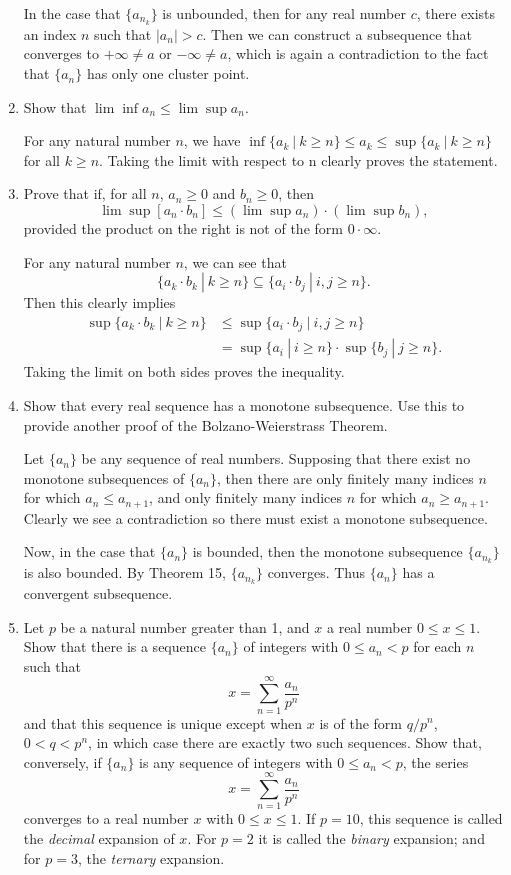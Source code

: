 \begin{enumerate}
	In the case that $\{a_{n_k}\}$ is unbounded, then for any real number $c$, there exists an index $n$ such that $|a_n| >c$.
	Then we can construct a subsequence that converges to $+\infty \neq a$ or $-\infty \neq a$, which is again a contradiction to the fact that $\{a_n\}$ has only one cluster point.
	\item Show that $\lim \inf a_n \le \lim \sup a_n$.\par
	For any natural number $n$, we have $\inf \{ a_k\ |\ k \ge n\} \le a_k \le \sup \{ a_k\ |\ k \ge n\}$ for all $k \ge n$.
	Taking the limit with respect to n clearly proves the statement.
	\item Prove that if, for all $n$, $a_n \ge 0$ and $b_n \ge 0 $, then \[ \lim \sup [a_n \cdot b_n] \le (\lim \sup a_n) \cdot (\lim \sup b_n),\] provided the product on the right is not of the form $0 \cdot \infty.$\par
	For any natural number $n$, we can see that 
	\[
	\{a_k \cdot b_k \ |\ k\ge n\} \subseteq \{a_i \cdot b_j \ |\ i,j\ge n\}.	
	\]
	Then this clearly implies
	\begin{align*}
	\sup\{a_k \cdot b_k \ |\ k\ge n\} &\le \sup\{a_i \cdot b_j \ |\ i,j\ge n\}\\
	&=\sup\{a_i\ |\ i\ge n\}\cdot\sup\{b_j\ |\ j\ge n\}.	
	\end{align*}
	Taking the limit on both sides proves the inequality.
	\item Show that every real sequence has a monotone subsequence. Use this to provide another proof of the Bolzano-Weierstrass Theorem.\par
	Let $\{a_n\}$ be any sequence of real numbers.
	Supposing that there exist no monotone subsequences of $\{a_n\}$, then there are only finitely many indices $n$ for which $a_n \le a_{n+1}$, and only finitely many indices $n$ for which $a_n \ge a_{n+1}$.
	Clearly we see a contradiction so there must exist a monotone subsequence.
	\par
	Now, in the case that $\{a_n\}$ is bounded, then the monotone subsequence $\{a_{n_k}\}$ is also bounded.
	By Theorem 15, $\{a_{n_k}\}$ converges.
	Thus $\{a_n\}$ has a convergent subsequence. 
	\item Let $p$ be a natural number greater than 1, and $x$ a real number $0 \le x \le 1.$ Show that there is a sequence $\{a_n\}$ of integers with $0 \le a_n < p$ for each $n$ such that \[ x = \sum_{n=1}^\infty\dfrac{a_n}{p^n} \] 
	and that this sequence is unique except when $x$ is of the form $q/p^n$, $0<q<p^n$, in which case there are exactly two such sequences. Show that, conversely, if $\{a_n\}$ is any sequence of integers with $0\le a_n < p$, the series \[ x = \sum_{n=1}^\infty\dfrac{a_n}{p^n} \] 
	converges to a real number $x$ with $0 \le x \le 1$. If $p = 10$, this sequence is called the \textit{decimal} expansion of $x$. For $p=2$ it is called the \textit{binary} expansion; and for $p=3$, the \textit{ternary} expansion.\par


\end{enumerate}
